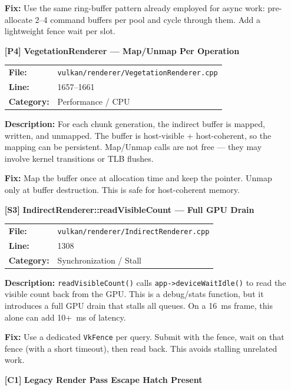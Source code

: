 \documentclass[a4paper,12pt]{article}
\newcommand{\severitybox}[2]{%
  \colorbox{#1}{\makebox[2.5cm][c]{\textcolor{white}{\textbf{#2}}}}%
}
\begin{document}
\begin{enumerate}[leftmargin=*]
  \textbf{Fix:}
  Use the same ring-buffer pattern already employed for async work:
  pre-allocate 2--4 command buffers per pool and cycle through them.
  Add a lightweight fence wait per slot.

\item[\textbf{[P4]}] \textbf{VegetationRenderer — Map/Unmap Per Operation}
  \hfill \severitybox{mediumcolor}{MEDIUM}

  \begin{tabular}{ll}
    \textbf{File:} & \texttt{vulkan/renderer/VegetationRenderer.cpp} \\
    \textbf{Line:} & 1657--1661 \\
    \textbf{Category:} & Performance / CPU \\
  \end{tabular}

  \textbf{Description:}
  For each chunk generation, the indirect buffer is mapped, written, and
  unmapped. The buffer is host-visible + host-coherent, so the mapping can
  be persistent. Map/Unmap calls are not free — they may involve kernel
  transitions or TLB flushes.

  \textbf{Fix:}
  Map the buffer once at allocation time and keep the pointer. Unmap only
  at buffer destruction. This is safe for host-coherent memory.

\item[\textbf{[S3]}] \textbf{IndirectRenderer::readVisibleCount — Full GPU Drain}
  \hfill \severitybox{mediumcolor}{MEDIUM}

  \begin{tabular}{ll}
    \textbf{File:} & \texttt{vulkan/renderer/IndirectRenderer.cpp} \\
    \textbf{Line:} & 1308 \\
    \textbf{Category:} & Synchronization / Stall \\
  \end{tabular}

  \textbf{Description:}
  \texttt{readVisibleCount()} calls \texttt{app->deviceWaitIdle()} to read
  the visible count back from the GPU. This is a debug/stats function, but
  it introduces a full GPU drain that stalls all queues. On a 16~ms frame,
  this alone can add 10+~ms of latency.

  \textbf{Fix:}
  Use a dedicated \texttt{VkFence} per query. Submit with the fence,
  wait on that fence (with a short timeout), then read back. This avoids
  stalling unrelated work.

\item[\textbf{[C1]}] \textbf{Legacy Render Pass Escape Hatch Present}
  \hfill \severitybox{mediumcolor}{MEDIUM}


\end{enumerate}
\end{document}
